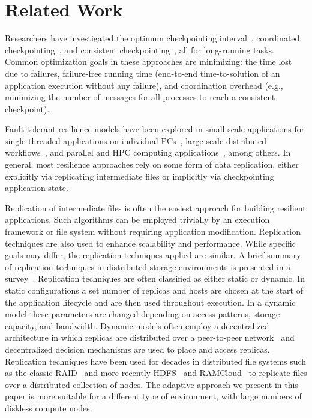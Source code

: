 \documentclass{sig-alternate}
\newcommand{\zhaonote}[1]{{\textcolor{cyan}    { ***Zhao:      #1 }}}
\newcommand{\zhaonote}[1]{}
\begin{document}
\section{Related Work}
\label{sec:Related}
Researchers have investigated the optimum checkpointing interval~\cite{young1974first, daly2006higher}, coordinated checkpointing~\cite{chandy1985distributed}, and consistent checkpointing~\cite{elnozahy1992performance}, all for long-running tasks.  Common optimization goals in these approaches are minimizing: the time lost due to failures, failure-free running time (end-to-end time-to-solution of an application execution without any failure), and coordination overhead (e.g., minimizing the number of messages for all processes to reach a consistent checkpoint). 

Fault tolerant resilience models have been explored in small-scale applications for single-threaded applications on individual PCs~\cite{condor1988, libckpt1994}, large-scale distributed workflows~\cite{uncoordinated2010}, and parallel and HPC computing applications~\cite{mist1995, consistent1994,FTworkshop2009}, among others. In  general, most resilience approaches rely on some form of data replication, either explicitly via replicating intermediate files or implicitly via checkpointing application state.

Replication of intermediate files is often the easiest approach for building resilient applications. Such algorithms can be employed trivially by an execution framework or file system without requiring application modification. Replication techniques are also used to enhance scalability and performance. While specific goals may differ, the replication techniques applied are similar. A brief summary of replication techniques in distributed storage environments is presented in a survey~\cite{survey2012}. Replication techniques are often classified as either static or dynamic. In static configurations a set number of replicas and hosts are chosen at the start of the application lifecycle and are then used throughout execution. In a dynamic model these parameters are changed depending on access patterns, storage capacity, and bandwidth.  Dynamic models often employ a decentralized architecture in which replicas are distributed over a peer-to-peer network~\cite{chord} and decentralized decision mechanisms are used to place and access replicas. Replication techniques have been used for decades in distributed file systems such as the classic RAID~\cite{raid1988} and more recently HDFS~\cite{HDFS} and RAMCloud~\cite{ramcloud2010, ramcloud2014} to replicate files over a distributed collection of nodes. %
The adaptive approach we present in this paper is more suitable for a different type of environment, with large numbers of diskless compute nodes.
\end{document}
